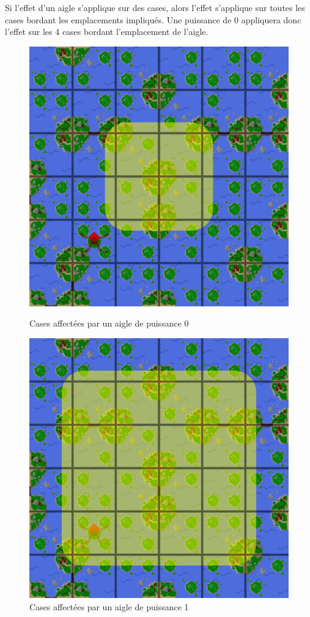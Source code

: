 Si l'effet d'un aigle s'applique sur des cases, alors l'effet s'applique sur
toutes les cases bordant les emplacements impliqués.
Une puissance de 0 appliquera donc l'effet sur les 4 cases bordant l'emplacement
de l'aigle.

\begin{figure}[h]
    \centering
    \begin{minipage}{.4\textwidth}
        \centering
        \includegraphics[width=.7\textwidth]{img/sprites/case0.png}
        \caption*{Cases affectées par un aigle de puissance 0}
    \end{minipage}
    \begin{minipage}{.4\textwidth}
        \centering
        \includegraphics[width=.7\textwidth]{img/sprites/case1.png}
        \caption*{Cases affectées par un aigle de puissance 1}
    \end{minipage}
\end{figure}

